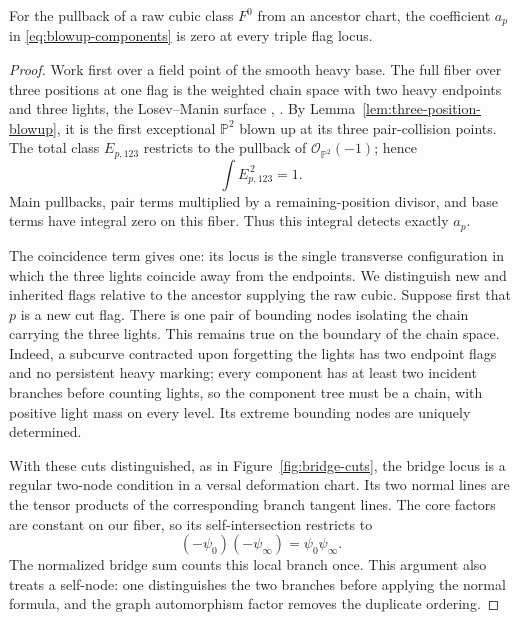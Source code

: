 \begin{lemma}\label{lem:triple-exceptional-cancellation}
For the pullback of a raw cubic class $F^0$ from an ancestor chart, the
coefficient $a_p$ in \eqref{eq:blowup-components} is zero at every
triple flag locus.
\end{lemma}

\begin{proof}
Work first over a field point of the smooth heavy base.  The full
fiber over three positions at one flag is the weighted chain space
with two heavy endpoints and three lights, the Losev--Manin surface
\cite[Theorems~2.2 and~2.6.3]{LosevManin},
\cite[\S6.4]{Hassett}. By
Lemma~\ref{lem:three-position-blowup}, it is the first exceptional
$\mathbb P^2$ blown up at its three pair-collision points.
The total class $E_{p,123}$ restricts to the pullback of
$\mathcal O_{\mathbb P^2}(-1)$; hence
\begin{equation}\label{eq:exceptional-square}
 \int E_{p,123}^{\,2}=1.
\end{equation}
Main pullbacks, pair terms multiplied by a remaining-position divisor,
and base terms have integral zero on this fiber.  Thus this integral
detects exactly $a_p$.

The coincidence term gives one: its locus is the single transverse
configuration in which the three lights coincide away from the
endpoints.  We distinguish new and inherited flags relative to the
ancestor supplying the raw cubic.  Suppose first that $p$ is a new cut
flag.  There is one pair of bounding nodes isolating the chain carrying
the three lights.
This remains true on the boundary of the chain space.  Indeed, a
subcurve contracted upon forgetting the lights has two endpoint flags
and no persistent heavy marking; every component has at least two
incident branches before counting lights, so the component tree must
be a chain, with positive light mass on every level.  Its extreme
bounding nodes are uniquely determined.

With these cuts distinguished, as in Figure~\ref{fig:bridge-cuts},
the bridge locus is a regular
two-node condition in a versal deformation chart.  Its two normal
lines are the tensor products of the corresponding branch tangent
lines.  The core factors are constant on our fiber, so its
self-intersection restricts to
\begin{equation}\label{eq:bridge-normal}
 (-\psi_0)(-\psi_\infty)=\psi_0\psi_\infty.
\end{equation}
The normalized bridge sum counts this local branch once.  This
argument also treats a self-node: one distinguishes the two branches
before applying the normal formula, and the graph automorphism factor
removes the duplicate ordering.


\end{proof}
